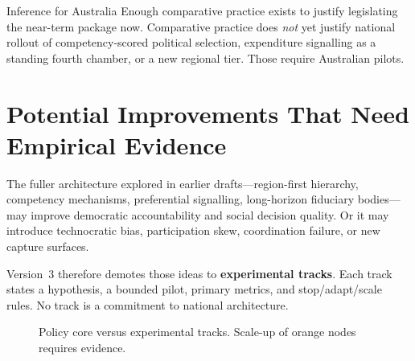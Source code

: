\documentclass[11pt,a4paper]{article}
\begin{document}
\begin{principlebox}{Inference for Australia}
Enough comparative practice exists to justify legislating the near-term package now. Comparative practice does \emph{not} yet justify national rollout of competency-scored political selection, expenditure signalling as a standing fourth chamber, or a new regional tier. Those require Australian pilots.
\end{principlebox}

\section{Potential Improvements That Need Empirical Evidence}

The fuller architecture explored in earlier drafts---region-first hierarchy, competency mechanisms, preferential signalling, long-horizon fiduciary bodies---may improve democratic accountability and social decision quality. Or it may introduce technocratic bias, participation skew, coordination failure, or new capture surfaces.

Version~3 therefore demotes those ideas to \textbf{experimental tracks}. Each track states a hypothesis, a bounded pilot, primary metrics, and stop/adapt/scale rules. No track is a commitment to national architecture.

\begin{figure}[H]
\centering
{}
\caption{Policy core versus experimental tracks. Scale-up of orange nodes requires evidence.}
\label{fig:core-vs-experiment}
\end{figure}
\end{document}
